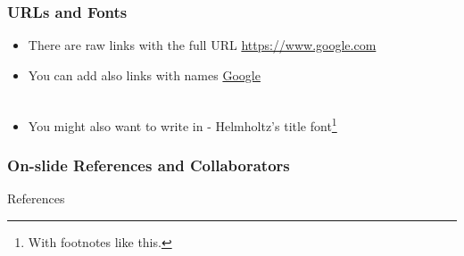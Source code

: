 \begin{frame}
    \frametitle{URLs and Fonts}

    \begin{itemize}
        \item There are raw links with the full URL \url{https://www.google.com}
        \item You can add also links with names \href{https://www.google.com}{Google}\\~

		\item You might also want to write in  - Helmholtz's title font\footnote{With footnotes like this.}
    \end{itemize}
\end{frame}

\begin{frame}
    \frametitle{On-slide References and Collaborators}


\end{frame}

\begin{frame}[allowframebreaks]{References}
    \printbibliography
\end{frame}
